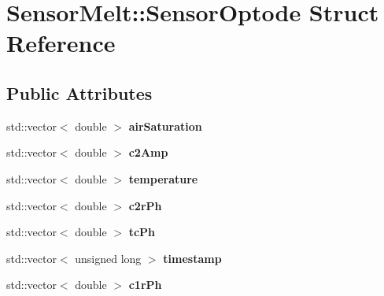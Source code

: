 \hypertarget{structSensorMelt_1_1SensorOptode}{}\section{Sensor\+Melt\+:\+:Sensor\+Optode Struct Reference}
\label{structSensorMelt_1_1SensorOptode}
\subsection*{Public Attributes}
\begin{DoxyCompactItemize}
\item 
std\+::vector$<$ double $>$ {\bfseries air\+Saturation}\hypertarget{structSensorMelt_1_1SensorOptode_ad30e0ae4ee63b7ae665ca22f55b0d439}{}\label{structSensorMelt_1_1SensorOptode_ad30e0ae4ee63b7ae665ca22f55b0d439}

\item 
std\+::vector$<$ double $>$ {\bfseries c2\+Amp}\hypertarget{structSensorMelt_1_1SensorOptode_a90287a5be339ce4aa19dbbfaa0f8eb3d}{}\label{structSensorMelt_1_1SensorOptode_a90287a5be339ce4aa19dbbfaa0f8eb3d}

\item 
std\+::vector$<$ double $>$ {\bfseries temperature}\hypertarget{structSensorMelt_1_1SensorOptode_a3e46adcbed09f48c9bbaf49f1c14df4d}{}\label{structSensorMelt_1_1SensorOptode_a3e46adcbed09f48c9bbaf49f1c14df4d}

\item 
std\+::vector$<$ double $>$ {\bfseries c2r\+Ph}\hypertarget{structSensorMelt_1_1SensorOptode_ad9a630039ebc238ddd8bc94d10993478}{}\label{structSensorMelt_1_1SensorOptode_ad9a630039ebc238ddd8bc94d10993478}

\item 
std\+::vector$<$ double $>$ {\bfseries tc\+Ph}\hypertarget{structSensorMelt_1_1SensorOptode_a2c15fe942e0b7a4d1860dc7745bc84a7}{}\label{structSensorMelt_1_1SensorOptode_a2c15fe942e0b7a4d1860dc7745bc84a7}

\item 
std\+::vector$<$ unsigned long $>$ {\bfseries timestamp}\hypertarget{structSensorMelt_1_1SensorOptode_aad2b0984c2a0fc5b2c3fbea3c9b22f68}{}\label{structSensorMelt_1_1SensorOptode_aad2b0984c2a0fc5b2c3fbea3c9b22f68}

\item 
std\+::vector$<$ double $>$ {\bfseries c1r\+Ph}\hypertarget{structSensorMelt_1_1SensorOptode_a417a62546f4b6f3fec3298bbd86a0e47}{}\label{structSensorMelt_1_1SensorOptode_a417a62546f4b6f3fec3298bbd86a0e47}


\end{DoxyCompactItemize}
